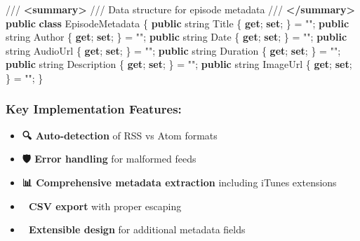 \documentclass[
  letterpaper,
  DIV=11,
  numbers=noendperiod]{scrartcl}
\newenvironment{Shaded}{\begin{snugshade}}{\end{snugshade}}
\newcommand{\CommentTok}[1]{\textcolor[rgb]{0.37,0.37,0.37}{#1}}
\newcommand{\DataTypeTok}[1]{\textcolor[rgb]{0.68,0.00,0.00}{#1}}
\newcommand{\KeywordTok}[1]{\textcolor[rgb]{0.00,0.23,0.31}{\textbf{#1}}}
\newcommand{\NormalTok}[1]{\textcolor[rgb]{0.00,0.23,0.31}{#1}}
\newcommand{\OperatorTok}[1]{\textcolor[rgb]{0.37,0.37,0.37}{#1}}
\newcommand{\StringTok}[1]{\textcolor[rgb]{0.13,0.47,0.30}{#1}}
\providecommand{\tightlist}{%
  \setlength{\itemsep}{0pt}\setlength{\parskip}{0pt}}\usepackage{longtable,booktabs,array}
\begin{document}
\begin{Shaded}
\begin{Highlighting}[]
\CommentTok{/// }\KeywordTok{\textless{}summary\textgreater{}}
\CommentTok{/// Data structure for episode metadata}
\CommentTok{/// }\KeywordTok{\textless{}/summary\textgreater{}}
\KeywordTok{public} \KeywordTok{class}\NormalTok{ EpisodeMetadata}
\OperatorTok{\{}
    \KeywordTok{public} \DataTypeTok{string}\NormalTok{ Title }\OperatorTok{\{} \KeywordTok{get}\OperatorTok{;} \KeywordTok{set}\OperatorTok{;} \OperatorTok{\}} \OperatorTok{=} \StringTok{""}\OperatorTok{;}
    \KeywordTok{public} \DataTypeTok{string}\NormalTok{ Author }\OperatorTok{\{} \KeywordTok{get}\OperatorTok{;} \KeywordTok{set}\OperatorTok{;} \OperatorTok{\}} \OperatorTok{=} \StringTok{""}\OperatorTok{;}
    \KeywordTok{public} \DataTypeTok{string}\NormalTok{ Date }\OperatorTok{\{} \KeywordTok{get}\OperatorTok{;} \KeywordTok{set}\OperatorTok{;} \OperatorTok{\}} \OperatorTok{=} \StringTok{""}\OperatorTok{;}
    \KeywordTok{public} \DataTypeTok{string}\NormalTok{ AudioUrl }\OperatorTok{\{} \KeywordTok{get}\OperatorTok{;} \KeywordTok{set}\OperatorTok{;} \OperatorTok{\}} \OperatorTok{=} \StringTok{""}\OperatorTok{;}
    \KeywordTok{public} \DataTypeTok{string}\NormalTok{ Duration }\OperatorTok{\{} \KeywordTok{get}\OperatorTok{;} \KeywordTok{set}\OperatorTok{;} \OperatorTok{\}} \OperatorTok{=} \StringTok{""}\OperatorTok{;}
    \KeywordTok{public} \DataTypeTok{string}\NormalTok{ Description }\OperatorTok{\{} \KeywordTok{get}\OperatorTok{;} \KeywordTok{set}\OperatorTok{;} \OperatorTok{\}} \OperatorTok{=} \StringTok{""}\OperatorTok{;}
    \KeywordTok{public} \DataTypeTok{string}\NormalTok{ ImageUrl }\OperatorTok{\{} \KeywordTok{get}\OperatorTok{;} \KeywordTok{set}\OperatorTok{;} \OperatorTok{\}} \OperatorTok{=} \StringTok{""}\OperatorTok{;}
\OperatorTok{\}}
\end{Highlighting}
\end{Shaded}

\subsubsection{Key Implementation
Features:}\label{key-implementation-features}

\begin{itemize}
\tightlist
\item
  \textbf{🔍 Auto-detection} of RSS vs Atom formats
\item
  \textbf{🛡️ Error handling} for malformed feeds
\item
  \textbf{📊 Comprehensive metadata extraction} including iTunes
  extensions
\item
  \textbf{💾 CSV export} with proper escaping
\item
  \textbf{🔧 Extensible design} for additional metadata fields
\end{itemize}
\end{document}
